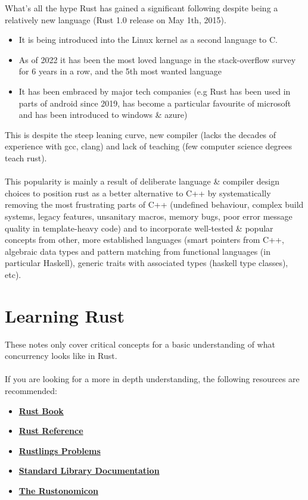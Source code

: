 \begin{sidenotebox}{What's all the hype}
    Rust has gained a significant following despite being a relatively new language (Rust 1.0 release on May 1th, 2015).
    \begin{itemize}
        \item It is being introduced into the Linux kernel as a second language to C.
        \item As of 2022 it has been the most loved language in the stack-overflow survey for 6 years in a row, and the 5th most wanted language
        \item It has been embraced by major tech companies (e.g Rust has been used in parts of android since 2019, has become a particular favourite of microsoft and has been introduced to windows \& azure)
    \end{itemize}
    This is despite the steep leaning curve, new compiler (lacks the decades of experience with gcc, clang) and lack of teaching (few computer science degrees teach rust).
    \\
    \\ This popularity is mainly a result of deliberate language \& compiler design choices to position rust as a better alternative to C++  by systematically removing the most frustrating parts of C++ (undefined behaviour, complex build systems, legacy features, unsanitary macros, memory bugs, poor error message quality in template-heavy code) and to incorporate well-tested \& popular concepts from other, more established languages (smart pointers from C++, algebraic data types and pattern matching from functional languages (in particular Haskell), generic traits with associated types (haskell type classes), etc).
\end{sidenotebox}

\section{Learning Rust}
These notes only cover critical concepts for a basic understanding of what concurrency looks like in Rust.
\\
\\ If you are looking for a more in depth understanding, the following resources are recommended:
\begin{itemize}
    \item \href{https://doc.rust-lang.org/book/}{\textbf{Rust Book}}
    \item \href{https://doc.rust-lang.org/reference/}{\textbf{Rust Reference}}
    \item \href{https://github.com/rust-lang/rustlings}{\textbf{Rustlings Problems}}
    \item \href{https://doc.rust-lang.org/std/}{\textbf{Standard Library Documentation}}
    \item \href{https://doc.rust-lang.org/nomicon/}{\textbf{The Rustonomicon}}
\end{itemize}

